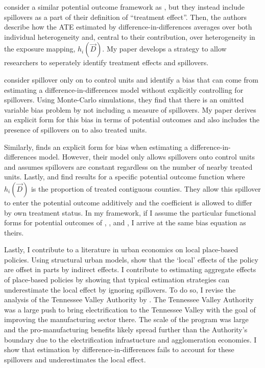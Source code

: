 \documentclass[11pt]{article}
\begin{document}
\citet{Sävje_Aronow_Hudgens_2019} consider a similar potential outcome framework as \citet{Vazquez-Bare_2019}, but they instead include spillovers as a part of their definition of ``treatment effect''. Then, the authors describe how the ATE estimated by difference-in-differences averages over both individual heterogeneity and, central to their contribution, over heterogeneity in the exposure mapping, $h_i(\vec{D})$. My paper develops a strategy to allow researchers to seperately identify treatment effects and spillovers.

\citet{Delgado_Florax_2015} consider spillover only on to control units and identify a bias that can come from estimating a difference-in-differences model without explicitly controlling for spillovers. Using Monte-Carlo simulations, they find that there is an omitted variable bias problem by not including a measure of spillovers. My paper derives an explicit form for this bias in terms of potential outcomes and also includes the presence of spillovers on to also treated units.

Similarly, \citet{Clarke_2017} finds an explicit form for bias when estimating a difference-in-differences model. However, their model only allows spillovers onto control units and assumes spillovers are constant regardless on the number of nearby treated units. Lastly, \citet{Berg_Streitz_2019} and \citet{Verbitsky-Savitz_Raudenbush_2012} find results for a specific potential outcome function where $h_i(\vec{D})$ is the proportion of treated contiguous counties. They allow this spillover to enter the potential outcome additively and the coefficient is allowed to differ by own treatment status. In my framework, if I assume the particular functional forms for potential outcomes of \citet{Clarke_2017}, \citet{Berg_Streitz_2019}, and \citet{Verbitsky-Savitz_Raudenbush_2012}, I arrive at the same bias equation as theirs. 

Lastly, I contribute to a literature in urban economics on local place-based policies. Using structural urban models, \citet{Kline_Moretti_2014b} show that the `local' effects of the policy are offset in parts by indirect effects. I contribute to estimating aggregate effects of place-based policies by showing that typical estimation strategies can underestimate the local effect by ignoring spillovers. To do so, I revise the analysis of the Tennessee Valley Authority by \citet{Kline_Moretti_2014}. The Tennessee Valley Authority was a large push to bring electrification to the Tennessee Valley with the goal of improving the manufacturing sector there. The scale of the program was large and the pro-manufacturing benefits likely spread further than the Authority's boundary due to the electrification infrastucture and agglomeration economies. I show that estimation by difference-in-differences fails to account for these spillovers and underestimates the local effect. 
\end{document}
